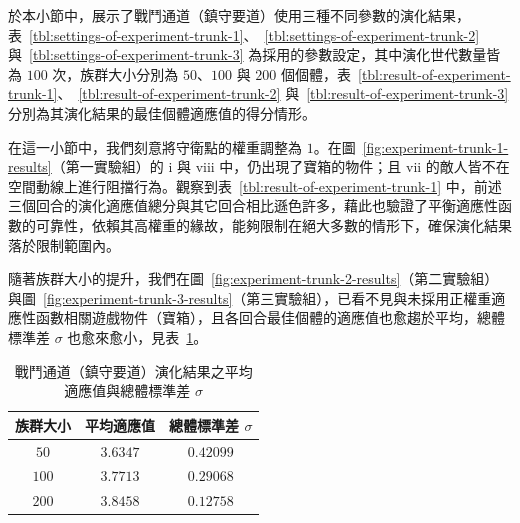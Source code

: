 於本小節中，展示了戰鬥通道（鎮守要道）使用三種不同參數的演化結果，表~\ref{tbl:settings-of-experiment-trunk-1}、~\ref{tbl:settings-of-experiment-trunk-2} 與~\ref{tbl:settings-of-experiment-trunk-3} 為採用的參數設定，其中演化世代數量皆為 $100$ 次，族群大小分別為 $50$、$100$ 與 $200$ 個個體，表~\ref{tbl:result-of-experiment-trunk-1}、~\ref{tbl:result-of-experiment-trunk-2} 與~\ref{tbl:result-of-experiment-trunk-3} 分別為其演化結果的最佳個體適應值的得分情形。

在這一小節中，我們刻意將守衛點的權重調整為 $1$。在圖~\ref{fig:experiment-trunk-1-results}（第一實驗組）的 i 與 viii 中，仍出現了寶箱的物件；且 vii 的敵人皆不在空間動線上進行阻擋行為。觀察到表~\ref{tbl:result-of-experiment-trunk-1} 中，前述三個回合的演化適應值總分與其它回合相比遜色許多，藉此也驗證了平衡適應性函數的可靠性，依賴其高權重的緣故，能夠限制在絕大多數的情形下，確保演化結果落於限制範圍內。

隨著族群大小的提升，我們在圖~\ref{fig:experiment-trunk-2-results}（第二實驗組）與圖~\ref{fig:experiment-trunk-3-results}（第三實驗組），已看不見與未採用正權重適應性函數相關遊戲物件（寶箱），且各回合最佳個體的適應值也愈趨於平均，總體標準差 $\sigma$ 也愈來愈小，見表~\ref{tbl:result-of-experiment-trunk-avg-sd}。

\begin{table}[H]
  \centering
  \caption{戰鬥通道（鎮守要道）演化結果之平均適應值與總體標準差 $\sigma$}
  \label{tbl:result-of-experiment-trunk-avg-sd}
  \bigskip
  \vspace{-5mm}
  \begin{tabular}[t]{ | c | c | c | }
    \hline
    族群大小 & 平均適應值 & 總體標準差 $\sigma$ \\\hline
    $50$  & $3.6347$ & $0.42099$ \\\hline
    $100$ & $3.7713$ & $0.29068$ \\\hline
    $200$ & $3.8458$ & $0.12758$ \\\hline
  \end{tabular}
\end{table}



